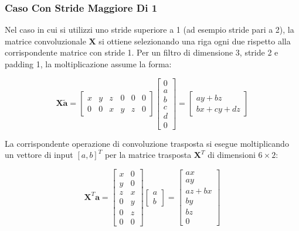 ﻿\documentclass[11pt, a4paper]{article}
\begin{document}
\newpage

\subsubsection{Caso Con Stride Maggiore Di 1}

Nel caso in cui si utilizzi uno stride superiore a 1 (ad esempio stride pari a 2), la matrice convoluzionale $\bm{X}$ si ottiene selezionando una riga ogni due rispetto alla corrispondente matrice con stride 1. Per un filtro di dimensione 3, stride 2 e padding 1, la moltiplicazione assume la forma:


\[
\bm{X}\tilde{\bm{a}} = \begin{bmatrix}
x & y & z & 0 & 0 & 0 \\
0 & 0 & x & y & z & 0
\end{bmatrix}
\begin{bmatrix}
0 \\ a \\ b \\ c \\ d \\ 0
\end{bmatrix} =
\begin{bmatrix}
ay + bz \\
bx + cy + dz
\end{bmatrix}
\]

La corrispondente operazione di convoluzione trasposta si esegue moltiplicando un vettore di input $[a, b]^T$ per la matrice trasposta $\bm{X}^T$ di dimensioni $6 \times 2$:

\[
\bm{X}^T\bm{a} = \begin{bmatrix}
x & 0 \\
y & 0 \\
z & x \\
0 & y \\
0 & z \\
0 & 0
\end{bmatrix}
\begin{bmatrix}
a \\ b
\end{bmatrix} =
\begin{bmatrix}
ax \\
ay \\
az + bx \\
by \\
bz \\
0
\end{bmatrix}
\]
\end{document}
